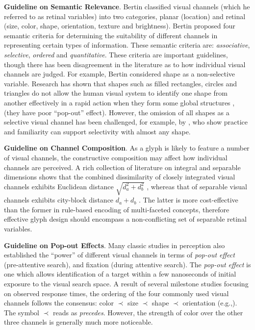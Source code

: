 \textbf{Guideline on Semantic Relevance}.
Bertin \cite{bertin83} classified visual channels (which he referred to as retinal variables) into two categories, planar (location) and retinal (size, color, shape, orientation, texture and brightness).
Bertin proposed four semantic criteria for determining the suitability of different channels in representing certain types of information.
These semantic criteria are: \emph{associative}, \emph{selective}, \emph{ordered} and \emph{quantitative}.
These criteria are important guidelines, though there has been disagreement in the literature as to how individual visual channels are judged.
For example, Bertin considered shape as a non-selective variable.
Research has shown that shapes such as filled rectangles, circles and triangles do not allow the human visual system to identify one shape from another effectively in a rapid action when they form some global structures \cite{love99, navon77}, (they have poor ``pop-out'' effect).
However, the omission of all shapes as a selective visual channel has been challenged, for example, by \cite{treisman88,wang94,green98}, who show practice and familiarity can support selectivity with almost any shape.

\textbf{Guideline on Channel Composition}.
As a glyph is likely to feature a number of visual channels, the constructive composition may affect how individual channels are perceived.
A rich collection of literature on integral and separable dimensions shows that the combined dissimilarity of closely integrated visual channels exhibits Euclidean distance $\sqrt{d^2_a + d^2_b}$ \cite{krantz75,handelt72}, whereas that of separable visual channels exhibits city-block distance $d_a  + d_b$ \cite{burns78,shepard64}. 
The latter is more cost-effective than the former in rule-based encoding of multi-faceted concepts, therefore effective glyph design should encompass a non-conflicting set of separable retinal variables. 

\textbf{Guideline on Pop-out Effects}.
Many classic studies in perception also established the ``power'' of different visual channels in terms of \emph{pop-out effect} (pre-attentive search), and fixation (during attentive search)\cite{healey11}.
The \emph{pop-out effect} is one which allows identification of a target within a few nanoseconds of initial exposure to the visual search space.
A result of several milestone studies focusing on observed response times, the ordering of the four commonly used visual channels follows the consensus: color $\prec$ size $\prec$ shape $\prec$ orientation (e.g.,\cite{williams67,quinlan97,ropinski11}).
The symbol $\prec$ reads as \emph{precedes}. However, the strength of color over the other three channels is generally much more noticeable. 

